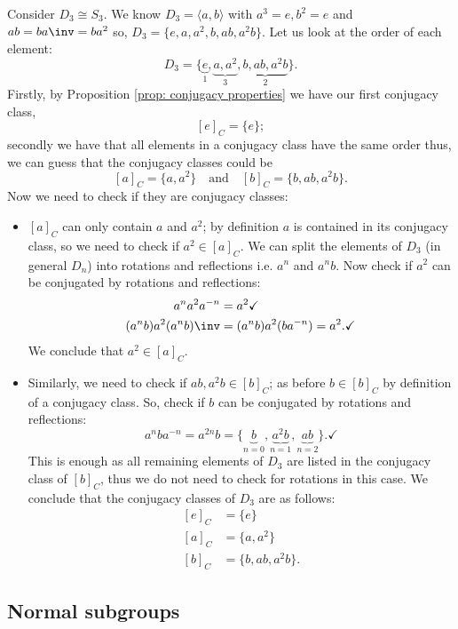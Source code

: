 \documentclass[12pt, a4paper]{article}
\begin{document}
\begin{mdexample}
    Consider \(D_3 \cong S_3\). We know \(D_3 = \langle a,b \rangle\) with \(a^3=e, b^2 =e\) and \(ab=ba\inv=ba^2\) so, \(D_3 = \{e,a,a^2,b,ab,a^2b\}\). Let us look at the order of each element: 
    \[D_3 = \{\underbrace{e}_{1},\underbrace{a,a^2}_{3},\underbrace{b,ab,a^2b}_{2}\}.\]
    Firstly, by Proposition \ref{prop: conjugacy properties} we have our first conjugacy class,
    \[[e]_C =\{e\};\]
    secondly we have that all elements in a conjugacy class have the same order thus, we can guess that the conjugacy classes could be 
    \[[a]_C = \{a,a^2\} \quad \text{and} \quad [b]_C =\{b,ab,a^2b\}.\]
    Now we need to check if they are conjugacy classes:
    \begin{itemize}
        \item \([a]_C\) can only contain \(a\) and \(a^2\); by definition \(a\) is contained in its conjugacy class, so we need to check if \(a^2 \in [a]_C\). We can split the elements of \(D_3\) (in general \(D_n\)) into rotations and reflections i.e. \(a^n\) and \(a^n b\). Now check if \(a^2\) can be conjugated by rotations and reflections:
        \[\begin{aligned}
            a^n a^2 a^{-n} &=a^2 \checkmark \\
            (a^n b) a^2 (a^n b)\inv &= (a^n b) a^2 (ba^{-n}) = a^2. \checkmark
        \end{aligned}\]
        We conclude that \(a^2 \in [a]_C\).
        \item Similarly, we need to check if \(ab,a^2b\in [b]_C\); as before \(b \in [b]_C\) by definition of a conjugacy class. So, check if \(b\) can be conjugated by rotations and reflections:
        \[
            a^n b a^{-n} = a^{2n}b =\{\underbrace{b}_{n=0},\underbrace{a^2 b}_{n=1} ,\underbrace{ab}_{n=2}\}.\checkmark
        \]
        This is enough as all remaining elements of \(D_3\) are listed in the conjugacy class of \([b]_C\), thus we do not need to check for rotations in this case.
        We conclude that the conjugacy classes of \(D_3\) are as follows:
        \[\begin{aligned}
            [e]_C &=\{e\} \\
            [a]_C &= \{a,a^2\} \\
            [b]_C &=\{b,ab,a^2 b\}.
        \end{aligned}\]
    \end{itemize}
\end{mdexample}

\subsection{Normal subgroups}
\end{document}

